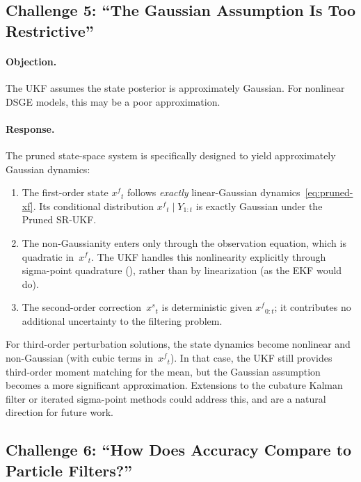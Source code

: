 \documentclass[12pt,a4paper]{article}
\newcommand{\xf}{{x^{f}}}
\newcommand{\xs}{{x^{s}}}
\begin{document}
\subsection{Challenge 5: ``The Gaussian Assumption Is Too Restrictive''}
\label{sec:challenge-gaussian}

\paragraph{Objection.}
The UKF assumes the state posterior is approximately Gaussian. For
nonlinear DSGE models, this may be a poor approximation.

\paragraph{Response.}
The pruned state-space system is specifically designed to yield
approximately Gaussian dynamics:
\begin{enumerate}[nosep]
\item The first-order state $\xf_t$ follows \emph{exactly}
linear-Gaussian dynamics~\eqref{eq:pruned-xf}. Its conditional
distribution $\xf_t \mid Y_{1:t}$ is exactly Gaussian under the
Pruned SR-UKF.
\item The non-Gaussianity enters only through the observation
equation, which is quadratic in~$\xf_t$. The UKF handles this
nonlinearity explicitly through sigma-point quadrature
(), rather than by linearization (as the EKF
would do).
\item The second-order correction~$\xs_t$ is deterministic given
$\xf_{0:t}$; it contributes no additional uncertainty to the
filtering problem.
\end{enumerate}

For third-order perturbation solutions, the state dynamics become
nonlinear and non-Gaussian (with cubic terms in~$\xf_t$). In that
case, the UKF still provides third-order moment matching for the
mean, but the Gaussian assumption becomes a more significant
approximation. Extensions to the cubature Kalman filter
\citep{arasaratnam2009cubature} or iterated sigma-point methods
could address this, and are a natural direction for future work.

\subsection{Challenge 6: ``How Does Accuracy Compare to Particle Filters?''}
\label{sec:challenge-pf}
\end{document}
